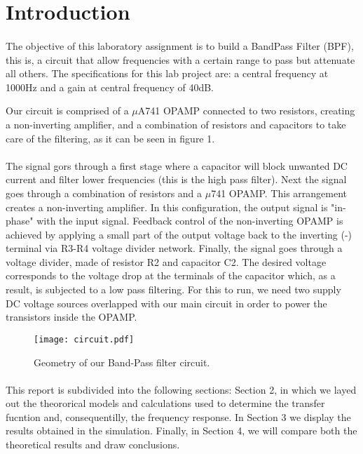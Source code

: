 
\section{Introduction}
\label{sec:introduction}


\paragraph{} The objective of this laboratory assignment is to build a BandPass Filter (BPF), this is, a circuit that allow frequencies with a certain range to pass but attenuate all others.
The specifications for this lab project are: a central frequency at 1000Hz and a gain at central frequency of 40dB.
 
Our circuit is comprised of a $\mu$A741 OPAMP connected to two resistors, creating a non-inverting amplifier, and a combination of resistors and capacitors to take care of the filtering, as it can 
be seen in figure 1.

\paragraph{} The signal gors through a first stage where a capacitor will block unwanted DC current and filter lower frequencies (this is the high pass filter). Next the signal goes through a combination of resistors and a $\mu$741 OPAMP. This arrangement creates 
a non-inverting amplifier. In this configuration, the output signal is "in-phase" with the input signal. Feedback control of the non-inverting OPAMP is achieved by applying a small part of 
the output voltage back to the inverting (-) terminal via R3-R4 voltage divider network. Finally, the signal goes through a voltage divider, made of resistor R2 and capacitor C2. The desired voltage corresponds to the voltage drop
 at the terminals of the capacitor which, as a result, is subjected to a low pass filtering. For this to run, we need two supply DC voltage sources 
overlapped with our main circuit in order to power the transistors inside the OPAMP.


\begin{figure}[h] \centering
\texttt{[image: circuit.pdf]}
\caption{Geometry of our Band-Pass filter circuit.}
\end{figure}

\paragraph{} This report is subdivided into the following sections: Section 2, in which we layed out the theororical models and calculations used to determine the transfer fucntion and, consequentilly, the frequency response.
In Section 3 we display the results obtained in the simulation. Finally, in Section 4, we will compare both the theoretical results and draw conclusions.

